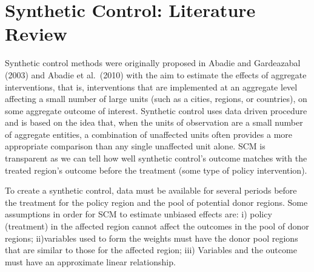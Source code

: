 \documentclass[
]{article}
\begin{document}
\newpage

\hypertarget{synthetic-control-literature-review}{%
\section{\texorpdfstring{\textbf{Synthetic Control: Literature
Review}}{Synthetic Control: Literature Review}}\label{synthetic-control-literature-review}}

Synthetic control methods were originally proposed in Abadie and
Gardeazabal (2003) and Abadie et al.~(2010) with the aim to estimate the
effects of aggregate interventions, that is, interventions that are
implemented at an aggregate level affecting a small number of large
units (such as a cities, regions, or countries), on some aggregate
outcome of interest. Synthetic control uses data driven procedure and is
based on the idea that, when the units of observation are a small number
of aggregate entities, a combination of unaffected units often provides
a more appropriate comparison than any single unaffected unit alone. SCM
is transparent as we can tell how well synthetic control's outcome
matches with the treated region's outcome before the treatment (some
type of policy intervention).

To create a synthetic control, data must be available for several
periods before the treatment for the policy region and the pool of
potential donor regions. Some assumptions in order for SCM to estimate
unbiased effects are: i) policy (treatment) in the affected region
cannot affect the outcomes in the pool of donor regions; ii)variables
used to form the weights must have the donor pool regions that are
similar to those for the affected region; iii) Variables and the outcome
must have an approximate linear relationship.
\end{document}
